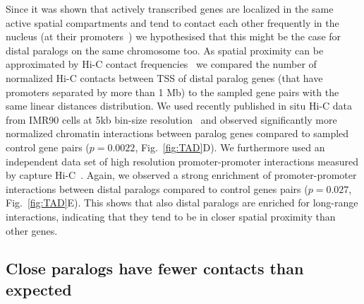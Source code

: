 \documentclass[a4paper,twoside=true,openright,parskip=full,chapterprefix=true,11pt,headings=normal,bibliography=totoc,listof=totoc,titlepage=on,captions=tableabove,draft=false]{scrreprt}
\theoremstyle{definition}
\theoremstyle{definition}
\theoremstyle{definition}
\theoremstyle{remark}
\begin{document}
Since it was shown that actively transcribed genes are localized in the
same active spatial compartments and tend to contact each other
frequently in the nucleus (at their
promoters~\citep{Cremer2015, Mifsud2015}) we hypothesised that this
might be the case for distal paralogs on the same chromosome too. As
spatial proximity can be approximated by Hi-C contact
frequencies~\citep{Lieberman-Aiden2009} we compared the number of
normalized Hi-C contacts between TSS of distal paralog genes (that have
promoters separated by more than 1 Mb) to the sampled gene pairs with
the same linear distances distribution. We used recently published in
situ Hi-C data from IMR90 cells at 5kb bin-size
resolution~\citep{Rao2014} and observed significantly more normalized
chromatin interactions between paralog genes compared to sampled control
gene pairs (\(p=0.0022\), Fig.~\ref{fig:TAD}D). We furthermore used an
independent data set of high resolution promoter-promoter interactions
measured by capture Hi-C~\citep{Mifsud2015}. Again, we observed a strong
enrichment of promoter-promoter interactions between distal paralogs
compared to control genes pairs (\(p=0.027\), Fig.~\ref{fig:TAD}E). This
shows that also distal paralogs are enriched for long-range
interactions, indicating that they tend to be in closer spatial
proximity than other genes.

\hypertarget{close-paralogs-have-fewer-contacts-than-expected}{%
\subsection{Close paralogs have fewer contacts than
expected}\label{close-paralogs-have-fewer-contacts-than-expected}}
\end{document}
